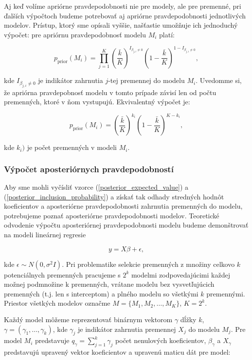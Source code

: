 Aj keď volíme apriórne pravdepodobnosti nie pre modely, ale pre premenné,
pri ďalších výpočtoch budeme potrebovať aj apriórne pravdepodobnosti jednotlivých modelov.
Prístup, ktorý sme opísali vyššie, našťastie umožňuje ich jednoduchý výpočet: pre apriórnu pravdepodobnosť modelu \(M_i\) platí:

\[
p_{\text{prior}}(M_i) = \prod_{j = 1}^K \left( \frac{\bar{k}}{K} \right)^{I_{\beta_{j, i} \neq 0}} \left( 1 - \frac{\bar{k}}{K} \right)^{1 - I_{\beta_{j, i} \neq 0}},
\]

kde \( I_{\beta_{j, i} \neq 0} \) je indikátor zahrnutia \(j\)-tej premennej do modelu \(M_i\).
Uvedomme si, že apriórna pravdepobnosť modelu v tomto prípade závisí len od počtu premenných, ktoré v ňom vystupujú.
Ekvivalentný výpočet je:

\[
p_{\text{prior}}(M_i) = \left( \frac{\bar{k}}{K} \right)^{k_i} \left( 1 - \frac{\bar{k}}{K} \right)^{K - k_i},
\]

kde \( k_i) \) je počet premenných v modeli \( M_i \).

\subsubsection{Výpočet aposteriórnych pravdepodobností}

Aby sme mohli vyčísliť vzorce (\ref{posterior_expected_value}) a (\ref{posterior_inclusion_probability}) a získať tak odhady stredných hodnôt koeficientov a aposteriórne pravdepodobnosti zahrnutia premenných do modelu,
potrebujeme poznať aposteriórne pravdepodobnosti modelov.
Teoretické odvodenie výpočtu aposteriórnej pravdepodobnosti modelu budeme demonštrovať na modeli lineárnej regresie

\begin{equation} \label{linear_regression}
y = X \beta + \epsilon,
\end{equation}

kde \( \epsilon \sim N(0, \sigma^2 I) \).
Pri problematike selekcie premenných z množiny celkovo \(k\) potenciálnych premenných pracujeme s \(2^k\) modelmi zodpovedajúcimi každej možnej podmnožine k premenných,
vrátane modelu bez vysvetľujúcich premenných (t.j. len s interceptom) a plného modelu so všetkými \(k\) premennými.
Priestor všetkých modelov označme \(M = \{ M_1, M_2, \ldots, M_K \} \), \(K = 2^k\).

Každý model môžeme reprezentovať binárnym vektorom \(\gamma\) dĺžky \(k\), \( \gamma = (\gamma_1, \ldots, \gamma_k) \), kde \( \gamma_j \) je indikátor zahrnutia premennej \(X_j\) do modelu \(M_j\).
Pre model \(M_i\) predstavuje \( q_{\gamma} = \sum_{j=1}^k \gamma_j \) počet nenulových koeficientov, \(\beta_{\gamma} \) a \( X_{\gamma} \) predstavujú upravený vektor koeficientov a upravenú maticu dát pre model:

